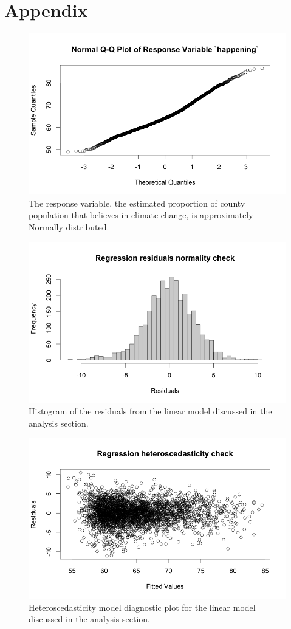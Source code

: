 \documentclass{article}
\begin{document}
\newpage
\section{Appendix}

\begin{figure}[H]
\centering
\includegraphics[scale=0.5]{images/response_qqplot.png}
\caption{The response variable, the estimated proportion of county population that believes in climate change, is approximately Normally distributed.}
\end{figure}

\begin{figure}[H]
\centering
\includegraphics[scale=0.5]{images/regression_residuals_hist.png}
\caption{Histogram of the residuals from the linear model discussed in the analysis section.}
\end{figure}

\begin{figure}[H]
\centering
\includegraphics[scale=0.5]{images/regression_variance_check.png}
\caption{Heteroscedasticity model diagnostic plot for the linear model discussed in the analysis section.}
\end{figure}
\end{document}
